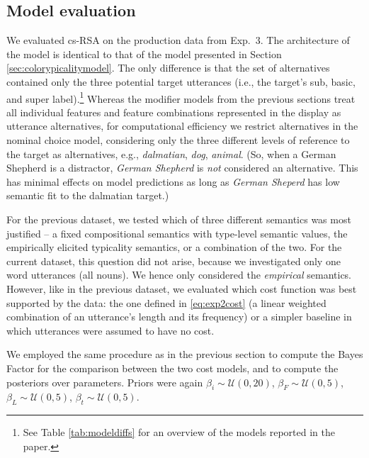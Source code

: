 \documentclass[11pt]{article}
\newcommand{\tableref}[1]{Table \ref{#1}}
\newcommand{\sectionref}[1]{Section \ref{#1}}
\begin{document}
\subsection{Model evaluation}
\label{sec:reflevelmodel}


We evaluated cs-RSA on the production data from Exp.~3. The architecture of the model is identical to that of the model presented in \sectionref{sec:colorypicalitymodel}. The only difference is that the set of alternatives contained only the three potential target utterances (i.e., the target's sub, basic, and super label).\footnote{See \tableref{tab:modeldiffs} for an overview of the models reported in the paper.} Whereas the modifier models from the previous sections treat all individual features and feature combinations represented in the display as utterance alternatives, for computational efficiency we restrict alternatives in the nominal choice model, considering only the three different levels of reference to the target as alternatives, e.g., \emph{dalmatian}, \emph{dog}, \emph{animal}. (So, when a German Shepherd is a distractor, \emph{German Shepherd} is \emph{not} considered an alternative. This has minimal effects on model predictions as long as \emph{German Sheperd} has low semantic fit to the dalmatian target.) 

For the previous dataset, we tested which of three different semantics was most justified -- a fixed compositional semantics with type-level semantic values, the empirically elicited typicality semantics, or a combination of the two. For the current dataset, this question did not arise, because we investigated only one word utterances (all nouns). We hence only considered the \emph{empirical} semantics. However, like in the previous dataset, we evaluated which cost function was best supported by the data: the one defined in \eqref{eq:exp2cost} (a linear weighted combination of an utterance's length and its frequency) or a simpler baseline in which utterances were assumed to have no cost.


We employed the same procedure as in the previous section to compute the Bayes Factor for the comparison between the two cost models, and to compute the posteriors over parameters. Priors were again  $\beta_i  \sim \mathcal{U}(0,20)$,  $\beta_{F} \sim \mathcal{U}(0,5)$, $\beta_{L} \sim \mathcal{U}(0,5)$, $\beta_t  \sim \mathcal{U}(0,5)$.
\end{document}
